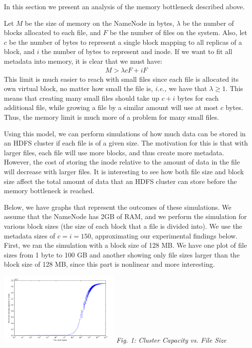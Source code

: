 \documentclass[11pt, a4paper]{article}
\begin{document}
\begin{multicols*}{2}
In this section we present an analysis of the memory bottleneck described above.

Let $ M $ be the size of memory on the NameNode in bytes, $ \lambda $ be the number of blocks allocated to each file, and $ F $ be the number of files on the system. Also, let $ c $ be the number of bytes to represent a single block mapping to all replicas of a block, and $i$ the number of bytes to represent and inode. If we want to fit all metadata into memory, it is clear that we must have:
\begin{align*}
	M > \lambda c F + i F
\end{align*}
This limit is much easier to reach with small files since each file is allocated its own virtual block, no matter how small the file is, \textit{i.e.,} we have that $ \lambda \geq 1$. This means that creating many small files should take up $ c + i$ bytes for each additional file, while growing a file by a similar amount will use at most $ c $ bytes. Thus, the memory limit is much more of a problem for many small files. 
	
Using this model, we can perform simulations of how much data can be stored in an HDFS cluster if each file is of a given size. The motivation for this is that with larger files, each file will use more blocks, and thus create more metadata. However, the cost of storing the inode relative to the amount of data in the file will decrease with larger files. It is interesting to see how both file size and block size affect the total amount of data that an HDFS cluster can store before the memory bottleneck is reached.
	
Below, we have graphs that represent the outcomes of these simulations. We assume that the NameNode has 2GB of RAM, and we perform the simulation for various block sizes (the size of each block that a file is divided into). We use the metadata sizes of $c = i = 150$, approximating our experimental findings below. First, we ran the simulation with a block size of 128 MB. We have one plot of file sizes from 1 byte to 100 GB and another showing only file sizes larger than the block size of 128 MB, since this part is nonlinear and more interesting. 
\begin{center}
	\includegraphics[keepaspectratio=true, width=0.45\textwidth]{logScale}
	\textit{Fig. 1: Cluster Capacity vs. File Size}
\end{center}


\end{multicols*}
\end{document}
